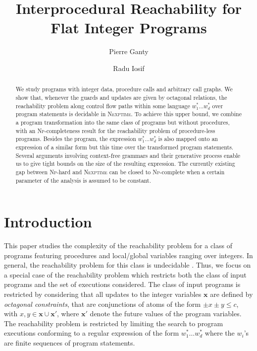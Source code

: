 \documentclass[final]{llncs}
\title{Interprocedural Reachability for Flat Integer Programs}
\author{Pierre Ganty\inst{1} \and Radu Iosif\inst{2}}
\institute{\({}^1\)IMDEA Software Institute \quad \({}^2\) CNRS/VERIMAG, Grenoble, France}
\renewcommand{\vec}[1]{{\bf {#1}}}
\renewcommand{\vec}[1]{{\mathbf {#1}}}
\begin{document}
\maketitle

\begin{abstract}
We study programs with integer data, procedure calls and arbitrary
call graphs. We show that, whenever the guards and updates are given
by octagonal relations, the reachability problem along control flow
paths within some language \(w_1^* \ldots w_d^*\) over program
statements is decidable in \textsc{Nexptime}. To achieve this upper
bound, we combine a program transformation into the same class of
programs but without procedures, with an \textsc{Np}-completeness
result for the reachability problem of procedure-less
programs. Besides the program, the expression \(w_1^* \ldots w_d^*\)
is also mapped onto an expression of a similar form but this time over
the transformed program statements. Several arguments involving
context-free grammars and their generative process enable us to give
tight bounds on the size of the resulting expression. The currently
existing gap between \textsc{Np}-hard and \textsc{Nexptime} can be
closed to \textsc{Np}-complete when a certain parameter of the
analysis is assumed to be constant.
\end{abstract}



\section{Introduction}

This paper studies the complexity of the reachability problem for a
class of programs featuring procedures and local/global variables
ranging over integers. In general, the reachability problem for this
class is undecidable \cite{minsky67}. Thus, we focus on a special case
of the reachability problem which restricts both the class of input
programs and the set of executions considered. The class of input
programs is restricted by considering that all updates to the integer
variables $\vec{x}$ are defined by \emph{octagonal constraints}, that
are conjunctions of atoms of the form $\pm x \pm y \leq c$, with
$x,y\in\vec{x}\cup\vec{x}'$, where $\vec{x}'$ denote the future values
of the program variables. The reachability problem is restricted by
limiting the search to program executions conforming to a regular
expression of the form \(w_1^*\ldots w_d^*\) where the \(w_i\)'s are
finite sequences of program statements.
\end{document}
